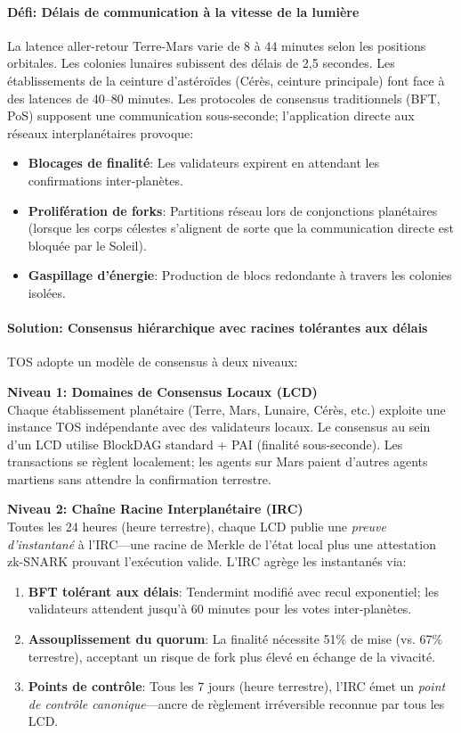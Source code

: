 \documentclass[11pt]{article}
\begin{document}
\paragraph{Défi: Délais de communication à la vitesse de la lumière}
La latence aller-retour Terre-Mars varie de 8 à 44 minutes selon les positions orbitales. Les colonies lunaires subissent des délais de 2,5 secondes. Les établissements de la ceinture d'astéroïdes (Cérès, ceinture principale) font face à des latences de 40--80 minutes. Les protocoles de consensus traditionnels (BFT, PoS) supposent une communication sous-seconde; l'application directe aux réseaux interplanétaires provoque:
\begin{itemize}[noitemsep]
  \item \textbf{Blocages de finalité}: Les validateurs expirent en attendant les confirmations inter-planètes.
  \item \textbf{Prolifération de forks}: Partitions réseau lors de conjonctions planétaires (lorsque les corps célestes s'alignent de sorte que la communication directe est bloquée par le Soleil).
  \item \textbf{Gaspillage d'énergie}: Production de blocs redondante à travers les colonies isolées.
\end{itemize}

\paragraph{Solution: Consensus hiérarchique avec racines tolérantes aux délais}
TOS adopte un modèle de consensus à deux niveaux:

\textbf{Niveau 1: Domaines de Consensus Locaux (LCD)}\\
Chaque établissement planétaire (Terre, Mars, Lunaire, Cérès, etc.) exploite une instance TOS indépendante avec des validateurs locaux. Le consensus au sein d'un LCD utilise BlockDAG standard + PAI (finalité sous-seconde). Les transactions se règlent localement; les agents sur Mars paient d'autres agents martiens sans attendre la confirmation terrestre.

\textbf{Niveau 2: Chaîne Racine Interplanétaire (IRC)}\\
Toutes les 24 heures (heure terrestre), chaque LCD publie une \emph{preuve d'instantané} à l'IRC—une racine de Merkle de l'état local plus une attestation zk-SNARK prouvant l'exécution valide. L'IRC agrège les instantanés via:
\begin{enumerate}[noitemsep]
  \item \textbf{BFT tolérant aux délais}: Tendermint modifié avec recul exponentiel; les validateurs attendent jusqu'à 60 minutes pour les votes inter-planètes.
  \item \textbf{Assouplissement du quorum}: La finalité nécessite 51\% de mise (vs. 67\% terrestre), acceptant un risque de fork plus élevé en échange de la vivacité.
  \item \textbf{Points de contrôle}: Tous les 7 jours (heure terrestre), l'IRC émet un \emph{point de contrôle canonique}—ancre de règlement irréversible reconnue par tous les LCD.
\end{enumerate}
\end{document}
